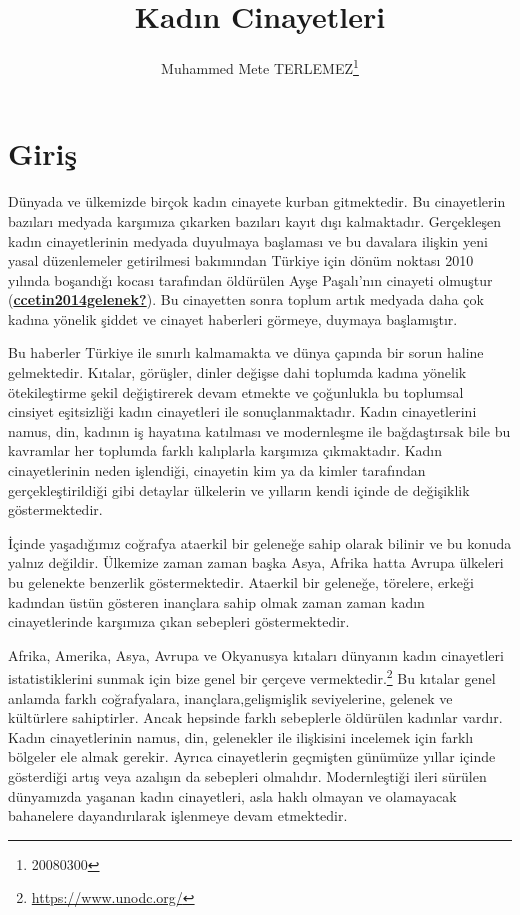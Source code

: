 \documentclass[
  12pt,
]{article}
\title{Kadın Cinayetleri}
\author{Muhammed Mete TERLEMEZ\footnote{20080300}}
\date{}
\begin{document}
\maketitle

\hypertarget{giriux15f}{%
\section{Giriş}\label{giriux15f}}

Dünyada ve ülkemizde birçok kadın cinayete kurban gitmektedir. Bu cinayetlerin bazıları medyada karşımıza çıkarken bazıları kayıt dışı kalmaktadır. Gerçekleşen kadın cinayetlerinin medyada duyulmaya başlaması ve bu davalara ilişkin yeni yasal düzenlemeler getirilmesi bakımından Türkiye için dönüm noktası 2010 yılında boşandığı kocası tarafından öldürülen Ayşe Paşalı'nın cinayeti olmuştur (\protect\hyperlink{ref-ccetin2014gelenek}{\textbf{ccetin2014gelenek?}}). Bu cinayetten sonra toplum artık medyada daha çok kadına yönelik şiddet ve cinayet haberleri görmeye, duymaya başlamıştır.

Bu haberler Türkiye ile sınırlı kalmamakta ve dünya çapında bir sorun haline gelmektedir. Kıtalar, görüşler, dinler değişse dahi toplumda kadına yönelik ötekileştirme şekil değiştirerek devam etmekte ve çoğunlukla bu toplumsal cinsiyet eşitsizliği kadın cinayetleri ile sonuçlanmaktadır. Kadın cinayetlerini namus, din, kadının iş hayatına katılması ve modernleşme ile bağdaştırsak bile bu kavramlar her toplumda farklı kalıplarla karşımıza çıkmaktadır. Kadın cinayetlerinin neden işlendiği, cinayetin kim ya da kimler tarafından gerçekleştirildiği gibi detaylar ülkelerin ve yılların kendi içinde de değişiklik göstermektedir.

İçinde yaşadığımız coğrafya ataerkil bir geleneğe sahip olarak bilinir ve bu konuda yalnız değildir. Ülkemize zaman zaman başka Asya, Afrika hatta Avrupa ülkeleri bu gelenekte benzerlik göstermektedir. Ataerkil bir geleneğe, törelere, erkeği kadından üstün gösteren inançlara sahip olmak zaman zaman kadın cinayetlerinde karşımıza çıkan sebepleri göstermektedir.

Afrika, Amerika, Asya, Avrupa ve Okyanusya kıtaları dünyanın kadın cinayetleri istatistiklerini sunmak için bize genel bir çerçeve vermektedir.\footnote{\url{https://www.unodc.org/}} Bu kıtalar genel anlamda farklı coğrafyalara, inançlara,gelişmişlik seviyelerine, gelenek ve kültürlere sahiptirler. Ancak hepsinde farklı sebeplerle öldürülen kadınlar vardır. Kadın cinayetlerinin namus, din, gelenekler ile ilişkisini incelemek için farklı bölgeler ele almak gerekir. Ayrıca cinayetlerin geçmişten günümüze yıllar içinde gösterdiği artış veya azalışın da sebepleri olmalıdır. Modernleştiği ileri sürülen dünyamızda yaşanan kadın cinayetleri, asla haklı olmayan ve olamayacak bahanelere dayandırılarak işlenmeye devam etmektedir.
\end{document}
